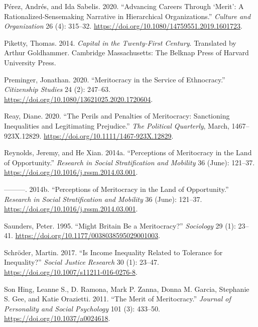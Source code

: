 \documentclass[
]{article}
\begin{document}
\leavevmode\hypertarget{ref-PerezAdvancingcareersmerit2020}{}%
Pérez, Andrés, and Ida Sabelis. 2020. ``Advancing Careers Through
`Merit': A Rationalized-Sensemaking Narrative in Hierarchical
Organizations.'' \emph{Culture and Organization} 26 (4): 315--32.
\url{https://doi.org/10.1080/14759551.2019.1601723}.

\leavevmode\hypertarget{ref-PikettyCapitalTwentyFirstCentury2014b}{}%
Piketty, Thomas. 2014. \emph{Capital in the Twenty-First Century}.
Translated by Arthur Goldhammer. Cambridge Massachusetts: The Belknap
Press of Harvard University Press.

\leavevmode\hypertarget{ref-PremingerMeritocracyserviceethnocracy2020}{}%
Preminger, Jonathan. 2020. ``Meritocracy in the Service of Ethnocracy.''
\emph{Citizenship Studies} 24 (2): 247--63.
\url{https://doi.org/10.1080/13621025.2020.1720604}.

\leavevmode\hypertarget{ref-ReayPerilsPenaltiesMeritocracy2020}{}%
Reay, Diane. 2020. ``The Perils and Penalties of Meritocracy:
Sanctioning Inequalities and Legitimating Prejudice.'' \emph{The
Political Quarterly}, March, 1467--923X.12829.
\url{https://doi.org/10.1111/1467-923X.12829}.

\leavevmode\hypertarget{ref-ReynoldsPerceptionsMeritocracyLand2014b}{}%
Reynolds, Jeremy, and He Xian. 2014a. ``Perceptions of Meritocracy in
the Land of Opportunity.'' \emph{Research in Social Stratification and
Mobility} 36 (June): 121--37.
\url{https://doi.org/10.1016/j.rssm.2014.03.001}.

\leavevmode\hypertarget{ref-reynolds_perceptions_2014}{}%
---------. 2014b. ``Perceptions of Meritocracy in the Land of
Opportunity.'' \emph{Research in Social Stratification and Mobility} 36
(June): 121--37. \url{https://doi.org/10.1016/j.rssm.2014.03.001}.

\leavevmode\hypertarget{ref-saundersMightBritainBe1995}{}%
Saunders, Peter. 1995. ``Might Britain Be a Meritocracy?''
\emph{Sociology} 29 (1): 23--41.
\url{https://doi.org/10.1177/0038038595029001003}.

\leavevmode\hypertarget{ref-schroder_Income_2017}{}%
Schröder, Martin. 2017. ``Is Income Inequality Related to Tolerance for
Inequality?'' \emph{Social Justice Research} 30 (1): 23--47.
\url{https://doi.org/10.1007/s11211-016-0276-8}.

\leavevmode\hypertarget{ref-son_hing_merit_2011-1}{}%
Son Hing, Leanne S., D. Ramona, Mark P. Zanna, Donna M. Garcia,
Stephanie S. Gee, and Katie Orazietti. 2011. ``The Merit of
Meritocracy.'' \emph{Journal of Personality and Social Psychology} 101
(3): 433--50. \url{https://doi.org/10.1037/a0024618}.
\end{document}
